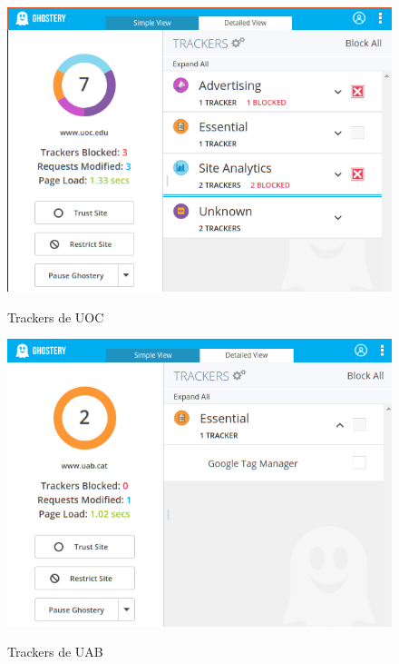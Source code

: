 \documentclass[10pt,a4paper]{article}
\begin{document}
\begin{figure}[H]
  \centering
  \includegraphics[scale=0.6]{ghost_uoc.png}\\
  \caption{Trackers de UOC}
  \label{fig:object}
\end{figure}

\begin{figure}[H]
  \centering
  \includegraphics[scale=0.6]{ghost_uab.png}\\
  \caption{Trackers de UAB}
  \label{fig:object}
\end{figure}
\end{document}

